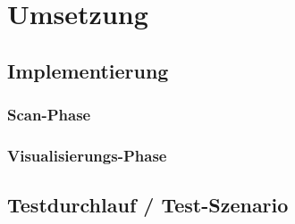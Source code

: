 

\chapter{Umsetzung}
\label{chap:Umsetzung}

\section{Implementierung}
\label{chap:implementierung}

\subsection{Scan-Phase} %
\subsection{Visualisierungs-Phase} 

\section{Testdurchlauf / Test-Szenario}
\label{chap:testdurchlauf}